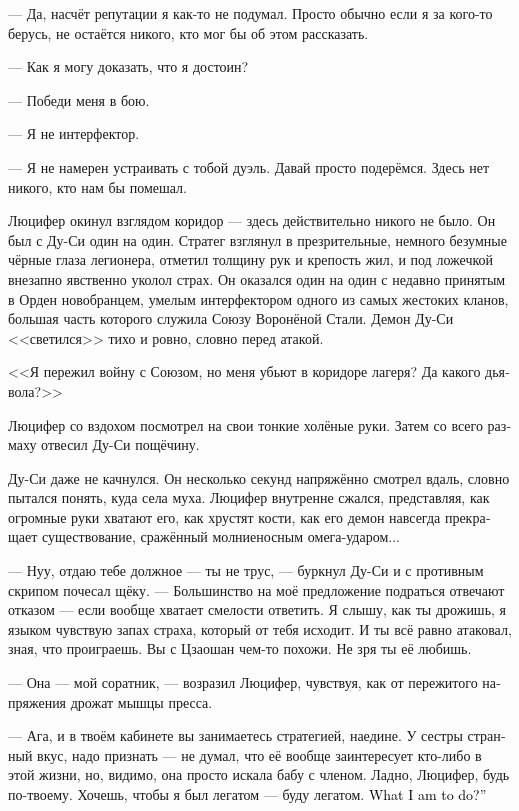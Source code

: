 \documentclass[a4paper,12pt,fleqn]{book}\usepackage{cooltooltips}\usepackage{polyglossia}\setdefaultlanguage[babelshorthands=true]{russian}\setotherlanguage{english}\defaultfontfeatures{Ligatures=TeX,Mapping=tex-text} \usepackage{xcolor}\definecolor{lightgray}{HTML}{bbbbbb}\color{lightgray}\newcommand{\ml}[3]{\textenglish{\textcolor{black}{#3}}}
\begin{document}
{--- Да, насчёт репутации я как-то не подумал.
Просто обычно если я за кого-то берусь, не остаётся никого, кто мог бы об этом рассказать.

--- Как я могу доказать, что я достоин?

--- Победи меня в бою.

--- Я не интерфектор.

--- Я не намерен устраивать с тобой дуэль.
Давай просто подерёмся.
Здесь нет никого, кто нам бы помешал.

Люцифер окинул взглядом коридор --- здесь действительно никого не было.
Он был с Ду-Си один на один.
Стратег взглянул в презрительные, немного безумные чёрные глаза легионера, отметил толщину рук и крепость жил, и под ложечкой внезапно явственно уколол страх.
Он оказался один на один с недавно принятым в Орден новобранцем, умелым интерфектором одного из самых жестоких кланов, большая часть которого служила Союзу Воронёной Стали.
Демон Ду-Си <<светился>> тихо и ровно, словно перед атакой.

<<Я пережил войну с Союзом, но меня убьют в коридоре лагеря?
Да какого дьявола?>>

Люцифер со вздохом посмотрел на свои тонкие холёные руки.
Затем со всего размаху отвесил Ду-Си пощёчину.

Ду-Си даже не качнулся.
Он несколько секунд напряжённо смотрел вдаль, словно пытался понять, куда села муха.
Люцифер внутренне сжался, представляя, как огромные руки хватают его, как хрустят кости, как его демон навсегда прекращает существование, сражённый молниеносным омега-ударом...

--- Нуу, отдаю тебе должное --- ты не трус, --- буркнул Ду-Си и с противным скрипом почесал щёку.
--- Большинство на моё предложение подраться отвечают отказом --- если вообще хватает смелости ответить.
Я слышу, как ты дрожишь, я языком чувствую запах страха, который от тебя исходит.
И ты всё равно атаковал, зная, что проиграешь.
Вы с Цзаошан чем-то похожи.
Не зря ты её любишь.

--- Она --- мой соратник, --- возразил Люцифер, чувствуя, как от пережитого напряжения дрожат мышцы пресса.

--- Ага, и в твоём кабинете вы занимаетесь стратегией, наедине.
У сестры странный вкус, надо признать --- не думал, что её вообще заинтересует кто-либо в этой жизни, но, видимо, она просто искала бабу с членом.
Ладно, Люцифер, будь по-твоему.
Хочешь, чтобы я был легатом --- буду легатом.
\ml{$0$}
{Что я должен делать?}
{What I am to do?''}

}
\end{document}
